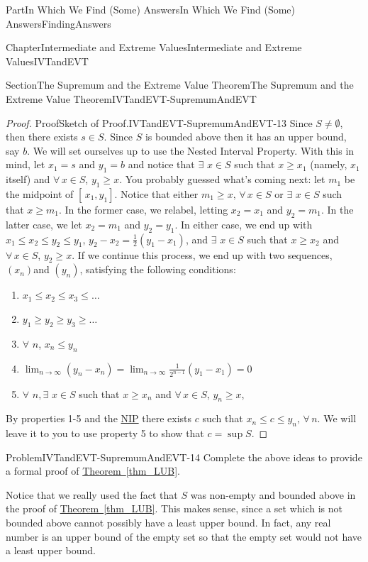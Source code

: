 \documentclass[oneside,10pt,]{book}
\newcommand{\xreffont}{\relax}
\numberwithin{equation}{part}
\begin{document}
\begin{partptx}{Part}{In Which We Find (Some) Answers}{}{In Which We Find (Some) Answers}{}{}{FindingAnswers}
\begin{chapterptx}{Chapter}{Intermediate and Extreme Values}{}{Intermediate and Extreme Values}{}{}{IVTandEVT}
\begin{sectionptx}{Section}{The Supremum and the Extreme Value Theorem}{}{The Supremum and the Extreme Value Theorem}{}{}{IVTandEVT-SupremumAndEVT}
\begin{proof}{Proof}{Sketch of Proof.}{IVTandEVT-SupremumAndEVT-13}
Since \(S\neq\emptyset\), then there exists \(s\in S\). Since \(S\) is bounded above then it has an upper bound, say \(b\). We will set ourselves up to use the Nested Interval Property. With this in mind, let \(x_1=s\) and \(y_1=b\) and notice that \(\exists\) \(x\in S\) such that \(x\geq x_1\) (namely, \(x_1\) itself) and \(\forall\,x\in S\), \(y_1\geq x\). You probably guessed what's coming next: let \(m_1\) be the midpoint of \([\,x_1,y_1]\). Notice that either \(m_1\geq x,\,\forall\,x\in S\) or \(\exists\) \(x\in S\) such that \(x\geq m_1\). In the former case, we relabel, letting \(x_2=x_1\) and \(y_2=m_1\). In the latter case, we let \(x_2=m_1\) and \(y_2=y_1\). In either case, we end up with \(x_1\leq x_2\leq y_2\leq y_1\), \(y_2-x_2=\frac{1}{2}\left(y_1-x_1\right)\), and \(\exists\) \(x\in S\) such that \(x\geq x_2\) and \(\forall\,x\in S\), \(y_2\geq x\). If we continue this process, we end up with two sequences, \(\left(x_n\right)\)and \(\left(y_n\right)\), satisfying the following conditions:%
\begin{enumerate}
\item{}\(\displaystyle x_1\leq x_2\leq x_3\leq\ldots\)%
\item{}\(\displaystyle y_1\geq y_2\geq y_3\geq\ldots\)%
\item{}\(\forall\) \(n\), \(x_n\leq y_n\)%
\item{}\(\displaystyle \lim_{n\rightarrow\infty}\left(y_n-x_n\right)=\lim_{n\rightarrow\infty} \frac{1}{2^{n-1}}\left(y_1-x_1\right)=0\)%
\item{}\(\forall\) \(n,\exists\) \(x\in S\) such that \(x\geq x_n\) and \(\forall\,x\in S\), \(y_n\geq x\),%
\end{enumerate}
%
\par
By properties 1-5 and the \hyperref[NIP]{NIP}  there exists \(c\) such that \(x_n\leq c\leq y_n,\,\forall\,n\). We will leave it to you to use property 5 to show that \(c=\sup S\).%
\end{proof}
\begin{problem}{Problem}{}{IVTandEVT-SupremumAndEVT-14}%
 Complete the above ideas to provide a formal proof of \hyperref[thm_LUB]{Theorem~{\xreffont\ref{thm_LUB}}}.%
\end{problem}
Notice that we really used the fact that \(S\) was non-empty and bounded above in the proof of \hyperref[thm_LUB]{Theorem~{\xreffont\ref{thm_LUB}}}. This makes sense, since a set which is not bounded above cannot possibly have a least upper bound. In fact, any real number is an upper bound of the empty set so that the empty set would not have a least upper bound.%

\end{sectionptx}
\end{chapterptx}
\end{partptx}
\end{document}
